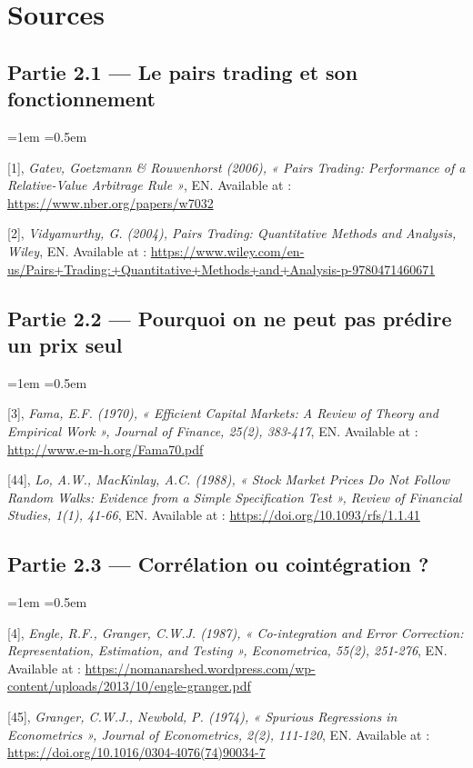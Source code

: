 \documentclass{article}
\begin{document}
\section{Sources}
\subsection*{Partie 2.1 --- Le pairs trading et son fonctionnement}
\begin{list}{}{\leftmargin=1em \itemsep=0.5em}
\item \hypertarget{ref1}{} [1], \textit{Gatev, Goetzmann \& Rouwenhorst (2006), « Pairs Trading: Performance of a Relative-Value Arbitrage Rule »}, EN. Available at : \url{https://www.nber.org/papers/w7032}
\item \hypertarget{ref2}{} [2], \textit{Vidyamurthy, G. (2004), Pairs Trading: Quantitative Methods and Analysis, Wiley}, EN. Available at : \url{https://www.wiley.com/en-us/Pairs+Trading:+Quantitative+Methods+and+Analysis-p-9780471460671}
\end{list}
\subsection*{Partie 2.2 --- Pourquoi on ne peut pas prédire un prix seul}
\begin{list}{}{\leftmargin=1em \itemsep=0.5em}
\item \hypertarget{ref3}{} [3], \textit{Fama, E.F. (1970), « Efficient Capital Markets: A Review of Theory and Empirical Work », Journal of Finance, 25(2), 383-417}, EN. Available at : \url{http://www.e-m-h.org/Fama70.pdf}
\item \hypertarget{ref44}{} [44], \textit{Lo, A.W., MacKinlay, A.C. (1988), « Stock Market Prices Do Not Follow Random Walks: Evidence from a Simple Specification Test », Review of Financial Studies, 1(1), 41-66}, EN. Available at : \url{https://doi.org/10.1093/rfs/1.1.41}
\end{list}
\subsection*{Partie 2.3 --- Corrélation ou cointégration ?}
\begin{list}{}{\leftmargin=1em \itemsep=0.5em}
\item \hypertarget{ref4}{} [4], \textit{Engle, R.F., Granger, C.W.J. (1987), « Co-integration and Error Correction: Representation, Estimation, and Testing », Econometrica, 55(2), 251-276}, EN. Available at : \url{https://nomanarshed.wordpress.com/wp-content/uploads/2013/10/engle-granger.pdf}
\item \hypertarget{ref45}{} [45], \textit{Granger, C.W.J., Newbold, P. (1974), « Spurious Regressions in Econometrics », Journal of Econometrics, 2(2), 111-120}, EN. Available at : \url{https://doi.org/10.1016/0304-4076(74)90034-7}
\end{list}
\end{document}
